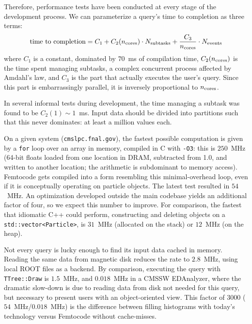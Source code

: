 \documentclass{article}
\begin{document}
Therefore, performance tests have been conducted at every stage of the development process. We can parameterize a query's time to completion as three terms:
\begin{equation}
\mbox{time to completion} = C_1 + C_2(n_{\mbox{\scriptsize cores}}) \cdot N_{\mbox{\scriptsize subtasks}} + \frac{C_3}{n_{\mbox{\scriptsize cores}}} \cdot N_{\mbox{\scriptsize events}}
\end{equation}
where $C_1$ is a constant, dominated by $70$~ms of compilation time, $C_2(n_{\mbox{\scriptsize cores}})$ is the time spent managing subtasks, a complex concurrent process affected by Amdahl's law, and $C_3$ is the part that actually executes the user's query. Since this part is embarrassingly parallel, it is inversely proportional to $n_{\mbox{\scriptsize cores}}$.

In several informal tests during development, the time managing a subtask was found to be $C_2(1) \sim 1$~ms. Input data should be divided into partitions such that this never dominates: at least a million values each.

On a given system ({\tt cmslpc.fnal.gov}), the fastest possible computation is given by a {\tt for} loop over an array in memory, compiled in C with {\tt -O3}: this is $250$~MHz (64-bit floats loaded from one location in DRAM, subtracted from 1.0, and written to another location; the arithmetic is subdominant to memory access). Femtocode gets compiled into a form resembling this minimal-overhead loop, even if it is conceptually operating on particle objects. The latest test resulted in $54$~MHz. An optimization developed outside the main codebase yields an additional factor of four, so we expect this number to improve. For comparison, the fastest that idiomatic C++ could perform, constructing and deleting objects on a {\tt std::vector<Particle>}, is $31$~MHz (allocated on the stack) or $12$~MHz (on the heap).

Not every query is lucky enough to find its input data cached in memory. Reading the same data from magnetic disk reduces the rate to $2.8$~MHz, using local ROOT files as a backend. By comparison, executing the query with {\tt TTree::Draw} is $1.5$~MHz, and $0.018$~MHz in a CMSSW EDAnalyzer, where the dramatic slow-down is due to reading data from disk not needed for this query, but necessary to present users with an object-oriented view. This factor of 3000 ($54$~MHz/$0.018$~MHz) is the difference between filling histograms with today's technology versus Femtocode without cache-misses.
\end{document}
